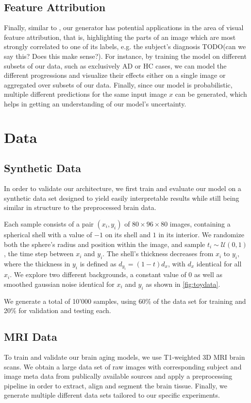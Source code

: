 \section{Feature Attribution}
Finally, similar to \cite{baumgartner2018visual}, our generator has potential applications in the area of visual feature attribution, that is, highlighting the parts of an image which are most strongly correlated to one of its labels, e.g. the subject's diagnosis TODO(can we say this? Does this make sense?).
For instance, by training the model on different subsets of our data, such as exclusively AD or HC cases, we can model the different progressions and visualize their effects either on a single image or aggregated over subsets of our data.
Finally, since our model is probabilistic, multiple different predictions for the same input image $x$ can be generated, which helps in getting an understanding of our model's uncertainty.

\chapter{Data}

\section{Synthetic Data}
\label{sec:datsynth}
In order to validate our architecture, we first train and evaluate our model on a synthetic data set designed to yield easily interpretable results while still being similar in structure to the preprocessed brain data.

Each sample consists of a pair $(x_i, y_i)$ of $ 80 \times 96 \times 80 $ images, containing a spherical shell with a value of $-1$ on its shell and $1$ in its interior. We randomize both the sphere's radius and position within the image, and sample $t_i \sim \mathcal{U}(0, 1)$, the time step between $x_i$ and $y_i$. The shell's thickness decreases from $x_i$ to $y_i$, where the thickness in $y_i$ is defined as $d_{y_i} = (1-t) d_x$, with $d_x$ identical for all $x_i$. We explore two different backgrounds, a constant value of 0 as well as smoothed gaussian noise identical for $x_i$ and $y_i$ as shown in \autoref{fig:toydata}.

We generate a total of 10'000 samples, using 60\% of the data set for training and 20\% for validation and testing each.

\section{MRI Data}
To train and validate our brain aging models, we use T1-weighted 3D MRI brain scans. We obtain a large data set of raw images with corresponding subject and image meta data from publically available sources and apply a preprocessing pipeline in order to extract, align and segment the brain tissue. Finally, we generate multiple different data sets tailored to our specific experiments.

